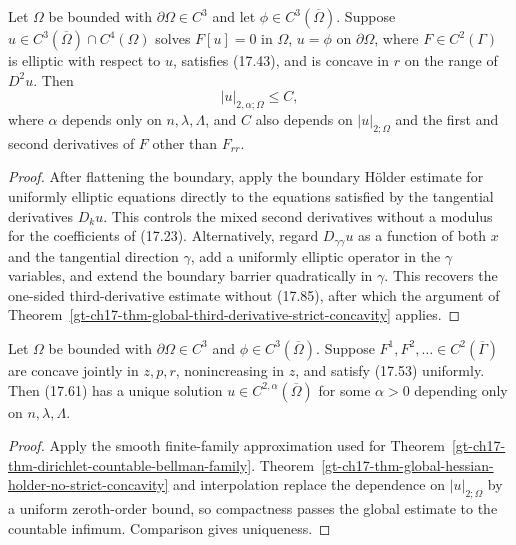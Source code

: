 \begin{theorem}
\label{gt-ch17-thm-global-hessian-holder-no-strict-concavity}
Let $\Omega$ be bounded with $\partial\Omega\in C^3$ and let
$\phi\in C^3(\overline\Omega)$.  Suppose
$u\in C^3(\overline\Omega)\cap C^4(\Omega)$ solves
$F[u]=0$ in $\Omega$, $u=\phi$ on $\partial\Omega$, where
$F\in C^2(\Gamma)$ is elliptic with respect to $u$, satisfies (17.43), and
is concave in $r$ on the range of $D^2u$.  Then
\begin{equation}\tag{17.86'}
|u|_{2,\alpha;\Omega}\le C,
\end{equation}
where $\alpha$ depends only on $n,\lambda,\Lambda$, and $C$ also depends on
$|u|_{2;\Omega}$ and the first and second derivatives of $F$ other than
$F_{rr}$.
\end{theorem}
\begin{proof}
\sketch After flattening the boundary, apply the boundary H\"older estimate
for uniformly elliptic equations directly to the equations satisfied by the
tangential derivatives $D_ku$.  This controls the mixed second derivatives
without a modulus for the coefficients of (17.23).  Alternatively, regard
$D_{\gamma\gamma}u$ as a function of both $x$ and the tangential direction
$\gamma$, add a uniformly elliptic operator in the $\gamma$ variables, and
extend the boundary barrier quadratically in $\gamma$.  This recovers the
one-sided third-derivative estimate without (17.85), after which the argument
of Theorem~\ref{gt-ch17-thm-global-third-derivative-strict-concavity} applies.
\end{proof}

\begin{theorem}
\label{gt-ch17-thm-global-regularity-bellman-families}
Let $\Omega$ be bounded with $\partial\Omega\in C^3$ and
$\phi\in C^3(\overline\Omega)$.  Suppose
$F^1,F^2,\ldots\in C^2(\overline\Gamma)$ are concave jointly in $z,p,r$,
nonincreasing in $z$, and satisfy (17.53) uniformly.  Then (17.61) has a
unique solution $u\in C^{2,\alpha}(\overline\Omega)$ for some $\alpha>0$
depending only on $n,\lambda,\Lambda$.
\end{theorem}
\begin{proof}
\sketch Apply the smooth finite-family approximation used for
Theorem~\ref{gt-ch17-thm-dirichlet-countable-bellman-family}.
Theorem~\ref{gt-ch17-thm-global-hessian-holder-no-strict-concavity} and
interpolation replace the dependence on
$|u|_{2;\Omega}$ by a uniform zeroth-order bound, so compactness passes the
global estimate to the countable infimum.  Comparison gives uniqueness.
\end{proof}

